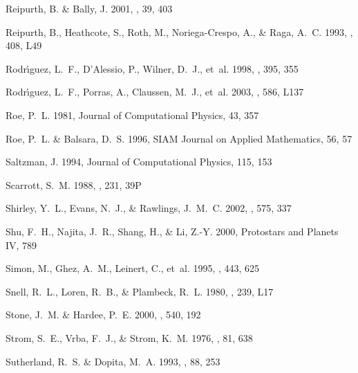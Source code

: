 \documentclass{aa}
\begin{document}
\begin{thebibliography}{80}
{Reipurth}, B. \& {Bally}, J. 2001, \araa, 39, 403

{Reipurth}, B., {Heathcote}, S., {Roth}, M., {Noriega-Crespo}, A., \& {Raga},
  A.~C. 1993, \apjl, 408, L49

{Rodr{\'{\i}}guez}, L.~F., {D'Alessio}, P., {Wilner}, D.~J., {et~al.} 1998,
  \nat, 395, 355

{Rodr{\'{\i}}guez}, L.~F., {Porras}, A., {Claussen}, M.~J., {et~al.} 2003,
  \apj, 586, L137

Roe, P.~L. 1981, Journal of Computational Physics, 43, 357

Roe, P.~L. \& Balsara, D.~S. 1996, SIAM Journal on Applied Mathematics, 56, 57

Saltzman, J. 1994, Journal of Computational Physics, 115, 153

{Scarrott}, S.~M. 1988, \mnras, 231, 39P

{Shirley}, Y.~L., {Evans}, N.~J., \& {Rawlings}, J.~M.~C. 2002, \apj, 575, 337

{Shu}, F.~H., {Najita}, J.~R., {Shang}, H., \& {Li}, Z.-Y. 2000, Protostars and
  Planets IV, 789

{Simon}, M., {Ghez}, A.~M., {Leinert}, C., {et~al.} 1995, \apj, 443, 625

{Snell}, R.~L., {Loren}, R.~B., \& {Plambeck}, R.~L. 1980, \apjl, 239, L17

{Stone}, J.~M. \& {Hardee}, P.~E. 2000, \apj, 540, 192

{Strom}, S.~E., {Vrba}, F.~J., \& {Strom}, K.~M. 1976, \aj, 81, 638

{Sutherland}, R.~S. \& {Dopita}, M.~A. 1993, \apj, 88, 253

\end{thebibliography}
\end{document}
